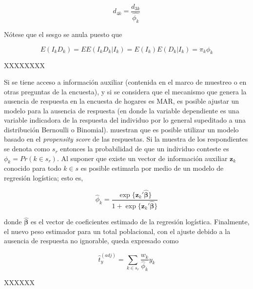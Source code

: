 \documentclass[12pt,spanish,]{book}
\begin{document}
\[
d_{4k} = \frac{d_{3k}}{\hat{\phi_k}}
\]

Nótese que el sesgo se anula puesto que

\[
E(I_kD_k) 
= EE(I_kD_k|I_k) 
= E(I_k)E(D_k|I_k) = \pi_k \phi_k
\]

XXXXXXXX

Si se tiene acceso a información auxiliar (contenida en el marco de muestreo o en otras preguntas de la encuesta), y si se considera que el mecanismo que genera la ausencia de respuesta en la encuesta de hogares es MAR, es posible ajustar un modelo para la ausencia de respuesta (en donde la variable dependiente es una variable indicadora de la respuesta del individuo por lo general supeditado a una distribución Bernoulli o Binomial). \textcite{Kim_Riddles_2012} muestran que es posible utilizar un modelo basado en el \emph{propensity score} de las respuestas. Si la muestra de los respondientes se denota como \(s_r\) entonces la probabilidad de que un individuo conteste es \(\phi_k = Pr(k \in s_r)\). Al suponer que existe un vector de información auxiliar \(\mathbf{z}_k\) conocido para todo \(k\in s\) es posible estimarla por medio de un modelo de regresión logística; esto es,

\[
\hat{\phi}_k = \frac{\exp\{\mathbf{z}_k'\hat{\boldsymbol{\beta}}\}}{1 + \exp\{\mathbf{z}_k'\hat{\boldsymbol{\beta}}\}}
\]

donde \(\hat{\mathbf{\beta}}\) es el vector de coeficientes estimado de la regresión logística. Finalmente, el nuevo peso estimador para un total poblacional, con el ajuste debido a la ausencia de respuesta no ignorable, queda expresado como

\[
\hat{t}_{y}^{(adj)}= \sum_{k\in s_r} \frac{w_k}{\hat{\phi}_k}y_k
\]

XXXXXX
\end{document}
